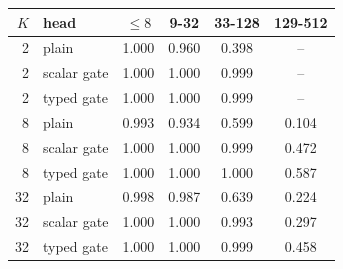 \begin{tabular}{rlcccc}
\toprule
$K$ & head & $\le 8$ & 9-32 & 33-128 & 129-512 \\
\midrule
2 & plain & 1.000 & 0.960 & 0.398 & -- \\
2 & scalar gate & 1.000 & 1.000 & 0.999 & -- \\
2 & typed gate & 1.000 & 1.000 & 0.999 & -- \\
8 & plain & 0.993 & 0.934 & 0.599 & 0.104 \\
8 & scalar gate & 1.000 & 1.000 & 0.999 & 0.472 \\
8 & typed gate & 1.000 & 1.000 & 1.000 & 0.587 \\
32 & plain & 0.998 & 0.987 & 0.639 & 0.224 \\
32 & scalar gate & 1.000 & 1.000 & 0.993 & 0.297 \\
32 & typed gate & 1.000 & 1.000 & 0.999 & 0.458 \\
\bottomrule
\end{tabular}
